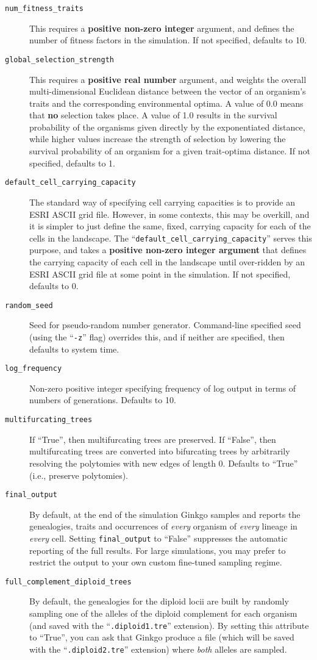\documentclass[11pt]{article}
\newcommand{\xmlattr}[1]{{\tt\textcolor{xmlattr}{#1}}}
\begin{document}
\begin{description}
	\item[\xmlattr{num\_fitness\_traits}] This requires a \textbf{positive non-zero integer} argument, and defines the number of fitness factors in the simulation. If not specified, defaults to 10.
	\item[\xmlattr{global\_selection\_strength}] This requires a \textbf{positive real number} argument, and weights the overall multi-dimensional Euclidean distance between the vector of an organism's traits and the corresponding environmental optima. A value of 0.0 means that \textbf{no} selection takes place. A value of 1.0 results in the survival probability of the organisms given directly by the exponentiated distance, while higher values increase the strength of selection by lowering the survival probability of an organism for a given trait-optima distance. If not specified, defaults to 1.
	\item[\xmlattr{default\_cell\_carrying\_capacity}] The standard way of specifying cell carrying capacities is to provide an ESRI ASCII grid file. However, in some contexts, this may be overkill, and it is simpler to just define the same, fixed, carrying capacity for each of the cells in the landscape. The ``\verb=default_cell_carrying_capacity='' serves this purpose, and takes a \textbf{positive non-zero integer argument} that defines the carrying capacity of each cell in the landscape until over-ridden by an ESRI ASCII grid file at some point in the simulation. If not specified, defaults to 0.
	\item[\xmlattr{random\_seed}] Seed for pseudo-random number generator. Command-line specified seed (using the ``{\tt -z}'' flag) overrides this, and if neither are specified, then defaults to system time.
	\item[\xmlattr{log\_frequency}] Non-zero positive integer specifying frequency of log output in terms of numbers of generations. Defaults to 10.
	\item[\xmlattr{multifurcating\_trees}] If ``True'', then multifurcating trees are preserved. If ``False'', then multifurcating trees are converted into bifurcating trees by arbitrarily resolving the polytomies with new edges of length 0. Defaults to ``True'' (i.e., preserve polytomies).
	\item[\xmlattr{final\_output}] By default, at the end of the simulation Ginkgo samples and reports the genealogies, traits and occurrences of \textit{every} organism of \textit{every} lineage in \textit{every} cell.  Setting \xmlattr{final\_output} to ``False'' suppresses the automatic reporting of the full results. For large simulations, you may prefer to restrict the output to your own custom fine-tuned sampling regime.
	\item[\xmlattr{full\_complement\_diploid\_trees}]	By default, the genealogies for the diploid locii are built by randomly sampling one of the alleles of the diploid complement for each organism (and saved with the ``{\tt .diploid1.tre}'' extension). By setting this attribute to ``True'', you can ask that Ginkgo produce a file (which will be saved with the ``{\tt .diploid2.tre}''  extension) where \textit{both} alleles are sampled.
\end{description}
\end{document}

